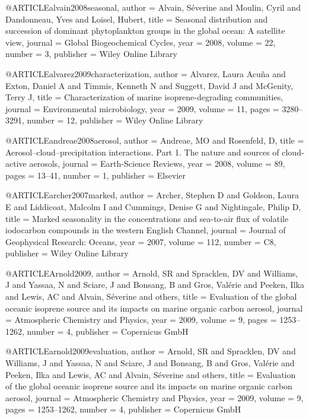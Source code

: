 @ARTICLE{alvain2008seasonal,
  author = {Alvain, S{\'e}verine and Moulin, Cyril and Dandonneau, Yves and Loisel,
	Hubert},
  title = {Seasonal distribution and succession of dominant phytoplankton groups
	in the global ocean: A satellite view},
  journal = {Global Biogeochemical Cycles},
  year = {2008},
  volume = {22},
  number = {3},
  publisher = {Wiley Online Library}
}

@ARTICLE{alvarez2009characterization,
  author = {Alvarez, Laura Acu{\~n}a and Exton, Daniel A and Timmis, Kenneth
	N and Suggett, David J and McGenity, Terry J},
  title = {Characterization of marine isoprene-degrading communities},
  journal = {Environmental microbiology},
  year = {2009},
  volume = {11},
  pages = {3280--3291},
  number = {12},
  publisher = {Wiley Online Library}
}

@ARTICLE{andreae2008aerosol,
  author = {Andreae, MO and Rosenfeld, D},
  title = {Aerosol--cloud--precipitation interactions. Part 1. The nature and
	sources of cloud-active aerosols},
  journal = {Earth-Science Reviews},
  year = {2008},
  volume = {89},
  pages = {13--41},
  number = {1},
  publisher = {Elsevier}
}

@ARTICLE{archer2007marked,
  author = {Archer, Stephen D and Goldson, Laura E and Liddicoat, Malcolm I and
	Cummings, Denise G and Nightingale, Philip D},
  title = {Marked seasonality in the concentrations and sea-to-air flux of volatile
	iodocarbon compounds in the western English Channel},
  journal = {Journal of Geophysical Research: Oceans},
  year = {2007},
  volume = {112},
  number = {C8},
  publisher = {Wiley Online Library}
}

@ARTICLE{Arnold2009,
  author = {Arnold, SR and Spracklen, DV and Williams, J and Yassaa, N and Sciare,
	J and Bonsang, B and Gros, Val{\'e}rie and Peeken, Ilka and Lewis,
	AC and Alvain, S{\'e}verine and others},
  title = {Evaluation of the global oceanic isoprene source and its impacts
	on marine organic carbon aerosol},
  journal = {Atmospheric Chemistry and Physics},
  year = {2009},
  volume = {9},
  pages = {1253--1262},
  number = {4},
  publisher = {Copernicus GmbH}
}

@ARTICLE{arnold2009evaluation,
  author = {Arnold, SR and Spracklen, DV and Williams, J and Yassaa, N and Sciare,
	J and Bonsang, B and Gros, Val{\'e}rie and Peeken, Ilka and Lewis,
	AC and Alvain, S{\'e}verine and others},
  title = {Evaluation of the global oceanic isoprene source and its impacts
	on marine organic carbon aerosol},
  journal = {Atmospheric Chemistry and Physics},
  year = {2009},
  volume = {9},
  pages = {1253--1262},
  number = {4},
  publisher = {Copernicus GmbH}
}

